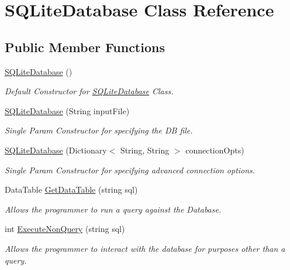 \hypertarget{class_s_q_lite_database}{\section{S\-Q\-Lite\-Database Class Reference}
\label{class_s_q_lite_database}
}
\subsection*{Public Member Functions}
\begin{DoxyCompactItemize}
\item 
\hyperlink{class_s_q_lite_database_af9bc221e2038f6930a6a04fbf0d8781e}{S\-Q\-Lite\-Database} ()
\begin{DoxyCompactList}\small\item\em Default Constructor for \hyperlink{class_s_q_lite_database}{S\-Q\-Lite\-Database} Class. \end{DoxyCompactList}\item 
\hyperlink{class_s_q_lite_database_ad9261ab4070d86a2d726389c93bd12b0}{S\-Q\-Lite\-Database} (String input\-File)
\begin{DoxyCompactList}\small\item\em Single Param Constructor for specifying the D\-B file. \end{DoxyCompactList}\item 
\hyperlink{class_s_q_lite_database_a7cb51ab3180452deecfbb61b15e13821}{S\-Q\-Lite\-Database} (Dictionary$<$ String, String $>$ connection\-Opts)
\begin{DoxyCompactList}\small\item\em Single Param Constructor for specifying advanced connection options. \end{DoxyCompactList}\item 
Data\-Table \hyperlink{class_s_q_lite_database_adc6db7bc86389a2a21d65afd6f271ac0}{Get\-Data\-Table} (string sql)
\begin{DoxyCompactList}\small\item\em Allows the programmer to run a query against the Database. \end{DoxyCompactList}\item 
int \hyperlink{class_s_q_lite_database_a9ee14da74d06a29b7a87c45b9aed6e69}{Execute\-Non\-Query} (string sql)
\begin{DoxyCompactList}\small\item\em Allows the programmer to interact with the database for purposes other than a query. \end{DoxyCompactList}\item 

\end{DoxyCompactItemize}
